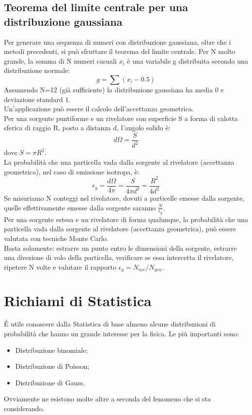 \documentclass[12pt, letterpaper]{book}
\begin{document}
\section{Teorema del limite centrale per una distribuzione gaussiana}
Per generare una sequenza di numeri con distribuzione gaussiana, oltre che i metodi precedenti, si può sfruttare il teorema del limite centrale.
Per N molto grande, la somma di N numeri casuali $x_i$ è una variabile g distribuita secondo una distribuzione normale:
$$g=\sum (x_i - 0.5)$$
Assumendo N=12 (già sufficiente) la distribuzione gaussiana ha media 0 e deviazione standard 1.\\
Un'applicazione può essere il calcolo dell'accettanza geometrica.\\
Per una sorgente puntiforme e un rivelatore con superficie S a forma di calotta sferica di raggio R, posto a distanza d, l’angolo solido è:
$$d\Omega=\frac{S}{d^2}$$
dove $S=\pi R^2$.\\
La probabilità che una particella vada dalla sorgente al rivelatore (accettanza geometrica), nel caso di emissione isotropa, è:
$$\epsilon_g=\frac{d\Omega}{4\pi}=\frac{S}{4\pi d^2}= \frac{R^2}{4d^2}$$
Se misuriamo N conteggi nel rivelatore, dovuti a 
particelle emesse dalla sorgente, quelle effettivamente emesse dalla sorgente saranno $\frac{N}{\epsilon_g}$.\\
Per una sorgente estesa e un rivelatore di forma qualunque, la probabilità che una particella vada dalla sorgente al rivelatore (accettanza geometrica), può essere valutata con tecniche Monte Carlo.\\
Basta solamente: estrarre un punto entro le dimensioni della sorgente, estrarre una direzione di volo della particella, verificare se essa intercetta il rivelatore, ripetere N volte e valutare il rapporto $\epsilon_g = N_{acc}/N_{gen}$.




\chapter{Richiami di Statistica}
\'E utile conoscere dalla Statistica di base almeno alcune distribuzioni di probabilità che hanno un grande interesse per la fisica. Le più importanti sono:
\begin{itemize}
    \item Distribuzione binomiale;
    \item Distribuzione di Poisson;
    \item Distribuzione di Gauss.
\end{itemize}
Ovviamente ne esistono molte altre a seconda del fenomeno che si sta considerando.
\end{document}
